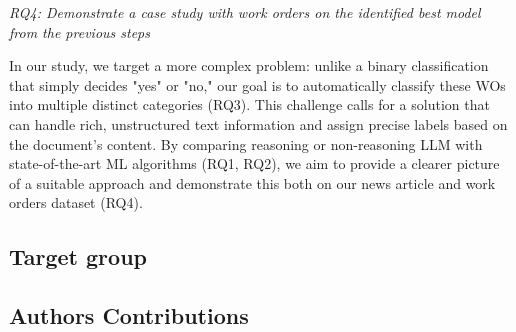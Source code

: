 \bigskip
\textit{RQ4: Demonstrate a case study with work orders on the identified best model from the previous steps} %

 In our study, we target a more complex problem: unlike a binary classification that simply decides "yes" or "no," our goal is to automatically classify these WOs into multiple distinct categories (RQ3). This challenge calls for a solution that can handle rich, unstructured text information and assign precise labels based on the document’s content. By comparing reasoning or non-reasoning LLM with state-of-the-art ML algorithms (RQ1, RQ2), we aim to provide a clearer picture of a suitable approach and demonstrate this both on our news article and work orders dataset (RQ4).

\subsection{Target group}
\subsection{Authors Contributions}